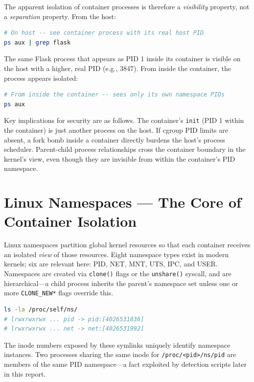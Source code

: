 The apparent isolation of container processes is therefore a \textit{visibility}
property, not a \textit{separation} property. From the host:

\begin{lstlisting}[language=bash]
# On host -- see container process with its real host PID
ps aux | grep flask
\end{lstlisting}

The same Flask process that appears as PID 1 inside its container is visible on the
host with a higher, real PID (e.g., 3847). From inside the container, the process
appears isolated:

\begin{lstlisting}[language=bash]
# From inside the container -- sees only its own namespace PIDs
ps aux
\end{lstlisting}

Key implications for security are as follows. The container's \texttt{init} (PID 1
within the container) is just another process on the host. If cgroup PID limits are
absent, a fork bomb inside a container directly burdens the host's process scheduler.
Parent-child process relationships cross the container boundary in the kernel's view,
even though they are invisible from within the container's PID namespace.


\section{Linux Namespaces --- The Core of Container Isolation}
\label{sec:namespaces}

Linux namespaces partition global kernel resources so that each container receives an
isolated \textit{view} of those resources. Eight namespace types exist in modern
kernels; six are relevant here: PID, NET, MNT, UTS, IPC, and USER. Namespaces are
created via \texttt{clone()} flags or the \texttt{unshare()} syscall, and are
hierarchical---a child process inherits the parent's namespace set unless one or more
\texttt{CLONE\_NEW*} flags override this.

\begin{lstlisting}[language=bash]
ls -la /proc/self/ns/
# lrwxrwxrwx ... pid -> pid:[4026531836]
# lrwxrwxrwx ... net -> net:[4026531992]
\end{lstlisting}

The inode numbers exposed by these symlinks uniquely identify namespace instances.
Two processes sharing the same inode for \texttt{/proc/\textless{}pid\textgreater{}/ns/pid}
are members of the same PID namespace---a fact exploited by detection scripts later
in this report.

